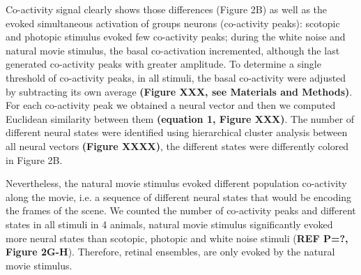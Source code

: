 \documentclass[9pt,twocolumn,twoside,lineno]{pnas-new}
\begin{document}

Co-activity signal clearly shows those differences (Figure 2B) as well as the evoked simultaneous activation of groups neurons (co-activity peaks): scotopic and photopic stimulus evoked few co-activity peaks; during the white noise and natural movie stimulus, the basal co-activation incremented, although the last generated co-activity peaks with greater amplitude. To determine a single threshold of co-activity peaks, in all stimuli, the basal co-activity were adjusted by subtracting its own average \textbf{(Figure XXX, see Materials and Methods)}. For each co-activity peak we obtained a neural vector and then we computed Euclidean similarity between them \textbf{(equation 1, Figure XXX)}. The number of different neural states were identified using hierarchical cluster analysis between all neural vectors \textbf{(Figure XXXX)}, the different states were differently colored in Figure 2B. 


Nevertheless, the natural movie stimulus evoked different population co-activity along the movie, i.e. a sequence of different neural states that would be encoding the frames of the scene. We counted the number of co-activity peaks and different states in all stimuli in 4 animals, natural movie stimulus significantly evoked more neural states than scotopic, photopic and white noise stimuli (\textbf{REF P=?, Figure 2G-H}). Therefore, retinal ensembles, are only evoked by the natural movie stimulus.

\end{document}
